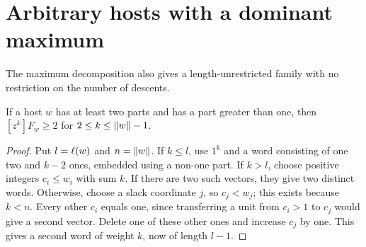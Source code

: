 \section{Arbitrary hosts with a dominant maximum}\label{sec:dominant}

The maximum decomposition also gives a length-unrestricted family with
no restriction on the number of descents.

\begin{lemma}\label{lem:twointernal}
If a host $w$ has at least two parts and has a part greater than one,
then $[z^k]F_w\ge2$ for $2\le k\le\lVert w\rVert-1$.
\end{lemma}
\begin{proof}
Put $l=\ell(w)$ and $n=\lVert w\rVert$. If $k\le l$, use $1^k$ and a word
consisting of one two and $k-2$ ones, embedded using a non-one part.
If $k>l$, choose positive integers $c_i\le w_i$ with sum $k$.
If there are two such vectors, they give two distinct words. Otherwise,
choose a slack coordinate $j$, so $c_j<w_j$; this exists because $k<n$.
Every other $c_i$ equals one, since transferring a unit from $c_i>1$
to $c_j$ would give a second vector. Delete one of these other ones and
increase $c_j$ by one. This gives a second word of weight $k$, now of
length $l-1$.
\end{proof}

